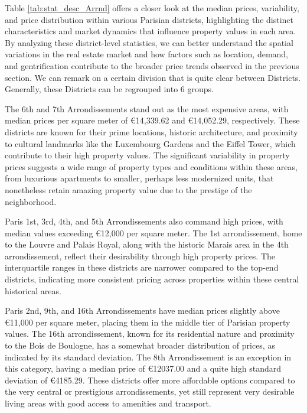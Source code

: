 \documentclass[12pt]{article}
\theoremstyle{plain}
\theoremstyle{remark}
\begin{document}
Table \ref{tab:stat_desc_Arrnd} offers a closer look at the median prices, variability, and price distribution within various Parisian districts, highlighting the distinct characteristics and market dynamics that influence property values in each area. By analyzing these district-level statistics, we can better understand the spatial variations in the real estate market and how factors such as location, demand, and gentrification contribute to the broader price trends observed in the previous section. We can remark on a certain division that is quite clear between Districts. Generally, these Districts can be regrouped into 6 groups. 

The 6th and 7th Arrondissements stand out as the most expensive areas, with median prices per square meter of €14,339.62 and €14,052.29, respectively. These districts are known for their prime locations, historic architecture, and proximity to cultural landmarks like the Luxembourg Gardens and the Eiffel Tower, which contribute to their high property values. The significant variability in property prices suggests a wide range of property types and conditions within these areas, from luxurious apartments to smaller, perhaps less modernized units, that nonetheless retain amazing property value due to the prestige of the neighborhood.

Paris 1st, 3rd, 4th, and 5th Arrondissements also command high prices, with median values exceeding €12,000 per square meter. The 1st arrondissement, home to the Louvre and Palais Royal, along with the historic Marais area in the 4th arrondissement, reflect their desirability through high property prices. The interquartile ranges in these districts are narrower compared to the top-end districts, indicating more consistent pricing across properties within these central historical areas.

Paris 2nd, 9th, and 16th Arrondissements have median prices slightly above €11,000 per square meter, placing them in the middle tier of Parisian property values. The 16th arrondissement, known for its residential nature and proximity to the Bois de Boulogne, has a somewhat broader distribution of prices, as indicated by its standard deviation. The 8th Arrondissement is an exception in this category, having a median price of €12037.00 and a quite high standard deviation of €4185.29. These districts offer more affordable options compared to the very central or prestigious arrondissements, yet still represent very desirable living areas with good access to amenities and transport.
\end{document}
